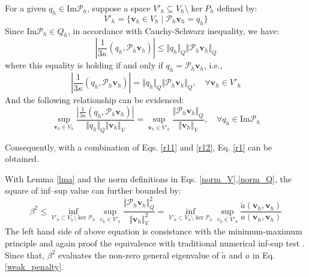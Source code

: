 \begin{pf}
For a given $q_h\in \mathrm{Im}\mathcal P_h$, suppose a space $V'_h \subseteq V_h\setminus \ker P_h$ defined by:
\begin{equation}
    V'_h = \{ \boldsymbol v_h \in V_h \; \vert \; \mathcal P_h \boldsymbol v_h = q_h \}
\end{equation}
Since $\mathrm{Im}\mathcal P_h \in Q_h$, in accordance with Cauchy-Schwarz inequality, we have:
\begin{equation}
    \left \vert \frac{1}{3\kappa}(q_h,\mathcal P_h \boldsymbol v_h) \right \vert \le \Vert q_h \Vert_Q \Vert \mathcal P_h \boldsymbol v_h \Vert_Q
\end{equation}
where this equality is holding if and only if $q_h=\mathcal P_h \boldsymbol v_h$, i.e.,
\begin{equation}
    \left \vert \frac{1}{3\kappa} (q_h,\mathcal P_h \boldsymbol v_h) \right \vert = \Vert q_h \Vert_Q \Vert \mathcal P_h \boldsymbol v_h \Vert_Q, \quad \forall \boldsymbol v_h \in V'_h
\end{equation}
And the following relationship can be evidenced:
\begin{equation}\label{r12}
        \sup_{\boldsymbol v_h\in V_h} \frac{\left \vert \frac{1}{3\kappa}(q_h,\mathcal P_h \boldsymbol v_h) \right \vert}{\Vert q_h \Vert_Q \Vert \boldsymbol v_h \Vert_V} =
        \sup_{\boldsymbol v_h\in V'_h} \frac{\Vert \mathcal P_h \boldsymbol v_h \Vert_Q}{\Vert \boldsymbol v_h \Vert_V}
    ,\quad \forall q_h \in \mathrm{Im}\mathcal P_h
\end{equation}

Consequently, with a combination of Eqs. \eqref{r11} and \eqref{r12}, Eq. \eqref{r1} can be obtained.
\end{pf}

\begin{rmk}
With Lemma \ref{lma} and the norm definitions in Eqs. \eqref{norm_V},\eqref{norm_Q}, 
the square of inf--sup value can further bounded by:
\begin{equation}
    \beta^2 \le \inf_{V'_h \subset V_h \setminus \ker \mathcal P_h} \sup_{v_h \in V'_h} \frac{\Vert \mathcal P_h \boldsymbol v_h \Vert_Q^2}{\Vert \boldsymbol v_h \Vert_V^2} =
    \inf_{V'_h \subset V_h \setminus \ker \mathcal P_h} \sup_{v_h \in V'_h} \frac{\tilde a(\boldsymbol v_h, \boldsymbol v_h)}{a(\boldsymbol v_h, \boldsymbol v_h)}
\end{equation}
The left hand side of above equation is consistance with the minimum-maximum principle \cite{babuska1991a}
and again proof the equivalence with traditional numerical inf-sup test \cite{malkus1981}. 
Since that, $\beta^2$ evaluates the non-zero general eigenvalue of $\tilde a$ and $a$ in Eq. \eqref{weak_penalty}.
\end{rmk}

